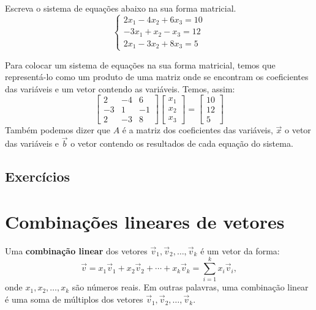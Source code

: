 \documentclass[../livro.tex]{subfiles}  %
\begin{document}
\begin{exeresol}
Escreva o sistema de equações abaixo na sua forma matricial.
\begin{equation}
 \left\{
  \begin{array}{ll}
    2x_1 - 4x_2 + 6x_3 = 10 \\
    -3x_1 + x_2 - x_3 = 12 \\
    2x_1 - 3x_2 + 8x_3 = 5
  \end{array}
\end{equation}
\end{exeresol}
\begin{resol}
Para colocar um sistema de equações na sua forma matricial, temos que representá-lo como um produto de uma matriz onde se encontram os coeficientes das variáveis e um vetor contendo as variáveis. Temos, assim:
\begin{equation}
 \left[
  \begin{array}{ccc}
    2 & -4 & 6  \\
    -3 & 1 & -1  \\
    2 & -3 & 8
  \end{array}
\right]
\left[
  \begin{array}{c}
   x_1 \\
   x_2 \\
   x_3 
  \end{array}
  \right] = 
\left[
  \begin{array}{c}
   10 \\
   12 \\
   5
  \end{array}
\right]
\end{equation}
Também podemos dizer que $A$ é a matriz dos coeficientes das variáveis, $\vec{x}$ o vetor das variáveis e $\vec{b}$ o vetor contendo os resultados de cada equação do sistema.
\end{resol}


\subsection*{Exercícios}

\construirExer


\section{Combinações lineares de vetores}

Uma \textbf{combinação linear} dos vetores $\vec{v}_1, \vec{v}_2, \dots, \vec{v}_k$ é um vetor da forma:
\begin{equation}
\vec{v} = x_1 \vec{v}_1 + x_2 \vec{v}_2 + \cdots + x_k \vec{v}_k = \sum_{i=1}^k x_i \vec{v}_i,
\end{equation} onde $x_1, x_2, \dots, x_k$ são números reais. Em outras palavras, uma combinação linear é uma soma de múltiplos dos vetores $\vec{v}_1, \vec{v}_2, \dots, \vec{v}_k$.
\end{document}
